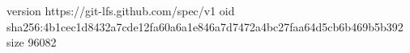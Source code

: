 version https://git-lfs.github.com/spec/v1
oid sha256:4b1cec1d8432a7cde12fa60a6a1e846a7d7472a4bc27faa64d5cb6b469b5b392
size 96082
